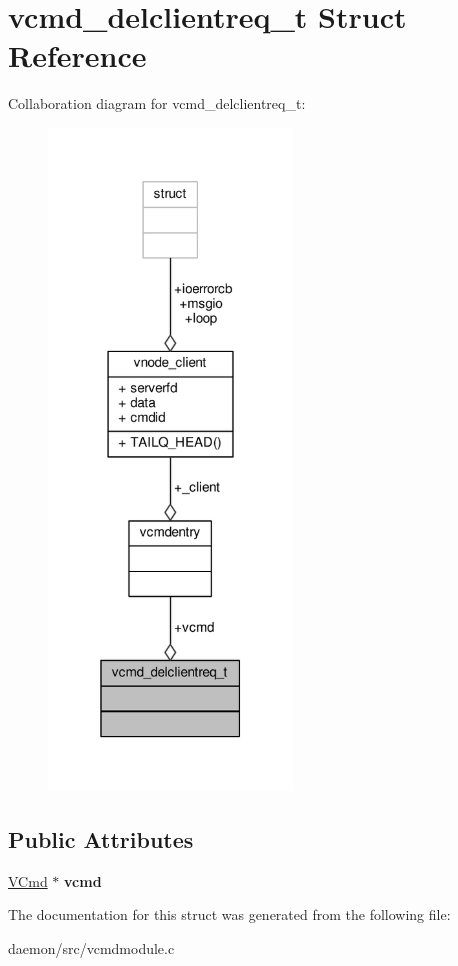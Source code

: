 \hypertarget{structvcmd__delclientreq__t}{\section{vcmd\+\_\+delclientreq\+\_\+t Struct Reference}
\label{structvcmd__delclientreq__t}
}


Collaboration diagram for vcmd\+\_\+delclientreq\+\_\+t\+:
\nopagebreak
\begin{figure}[H]
\begin{center}
\leavevmode
\includegraphics[width=184pt]{structvcmd__delclientreq__t__coll__graph}
\end{center}
\end{figure}
\subsection*{Public Attributes}
\begin{DoxyCompactItemize}
\item 
\hypertarget{structvcmd__delclientreq__t_ac4b20ee1651cd18e891504820a9b84a9}{\hyperlink{structvcmdentry}{V\+Cmd} $\ast$ {\bfseries vcmd}}\label{structvcmd__delclientreq__t_ac4b20ee1651cd18e891504820a9b84a9}

\end{DoxyCompactItemize}


The documentation for this struct was generated from the following file\+:\begin{DoxyCompactItemize}
\item 
daemon/src/vcmdmodule.\+c\end{DoxyCompactItemize}
